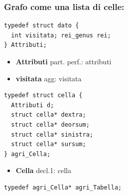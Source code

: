 \documentclass[8pt]{book}
\begin{document}
\subsubsection{Grafo come una lista di celle:}

\begin{spacing}{0.9}
  \begin{small}
    \begin{tcolorbox}
\begin{verbatim}
typedef struct dato {
  int visitata; rei_genus rei;
} Attributi;
\end{verbatim}
  \end{tcolorbox}
    \end{small}
      \end{spacing}

\begin{itemize}

\item
  \textbf{Attributi} part. perf.: attributi
\item
  \textbf{visitata} agg: visitata
\end{itemize}

\begin{spacing}{0.9}
  \begin{small}
    \begin{tcolorbox}
\begin{verbatim}
typedef struct cella {
  Attributi d;
  struct cella* dextra;
  struct cella* deorsum;
  struct cella* sinistra;
  struct cella* sursum;
} agri_Cella;
\end{verbatim}
  \end{tcolorbox}
    \end{small}
      \end{spacing}

\begin{itemize}

\item
  \textbf{Cella} decl.1: cella
\end{itemize}

\begin{spacing}{0.9}
  \begin{small}
    \begin{tcolorbox}
\begin{verbatim}
typedef agri_Cella* agri_Tabella;
\end{verbatim}
  \end{tcolorbox}
    \end{small}
      \end{spacing}
\end{document}
